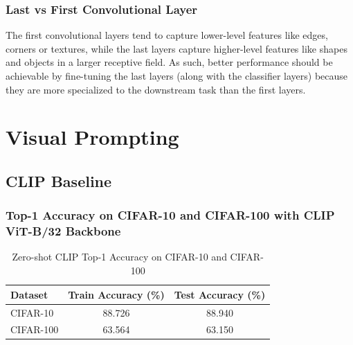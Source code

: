 \documentclass[a4paper]{article}
\begin{document}
\subsubsection{Last vs First Convolutional Layer}
The first convolutional layers tend to capture lower-level features like edges, corners or textures, while the last
layers capture higher-level features like shapes and objects in a larger receptive field. As such, better performance
should be achievable by fine-tuning the last layers (along with the classifier layers) because they are more
specialized to the downstream task than the first layers.
\bigskip

\section{Visual Prompting}
\subsection{CLIP Baseline}
\subsubsection{Top-1 Accuracy on CIFAR-10 and CIFAR-100 with CLIP ViT-B/32 Backbone}
\begin{table}[h]
    \centering
    \begin{tabular}{|l|c|c|}
    \hline
    \rowcolor{Gray}
    \textbf{Dataset} & \textbf{Train Accuracy (\%)} & \textbf{Test Accuracy (\%)} \\ \hline
    CIFAR-10 & 88.726 & 88.940 \\ \hline
    CIFAR-100 & 63.564 & 63.150 \\ \hline
    \end{tabular}
    \caption{Zero-shot CLIP Top-1 Accuracy on CIFAR-10 and CIFAR-100}
    \label{tab:clip_accuracy}
\end{table}
\end{document}
